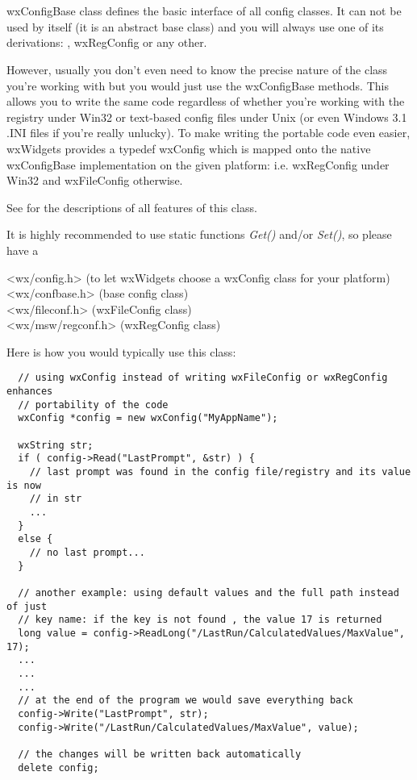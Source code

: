 \section{}\label{wxconfigbase}

wxConfigBase class defines the basic interface of all config classes. It can
not be used by itself (it is an abstract base class) and you will always use one
of its derivations: ,
wxRegConfig or any other.

However, usually you don't even need to know the precise nature of the class
you're working with but you would just use the wxConfigBase methods. This
allows you to write the same code regardless of whether you're working with
the registry under Win32 or text-based config files under Unix (or even
Windows 3.1 .INI files if you're really unlucky). To make writing the portable
code even easier, wxWidgets provides a typedef wxConfig
which is mapped onto the native wxConfigBase implementation on the given
platform: i.e. wxRegConfig under Win32 and
wxFileConfig otherwise.

See  for the descriptions of all
features of this class.

It is highly recommended to use static functions {\it Get()} and/or {\it Set()}, 
so please have a 




<wx/config.h> (to let wxWidgets choose a wxConfig class for your platform)\\
<wx/confbase.h> (base config class)\\
<wx/fileconf.h> (wxFileConfig class)\\
<wx/msw/regconf.h> (wxRegConfig class)


Here is how you would typically use this class:

\begin{verbatim}
  // using wxConfig instead of writing wxFileConfig or wxRegConfig enhances
  // portability of the code
  wxConfig *config = new wxConfig("MyAppName");

  wxString str;
  if ( config->Read("LastPrompt", &str) ) {
    // last prompt was found in the config file/registry and its value is now
    // in str
    ...
  }
  else {
    // no last prompt...
  }

  // another example: using default values and the full path instead of just
  // key name: if the key is not found , the value 17 is returned
  long value = config->ReadLong("/LastRun/CalculatedValues/MaxValue", 17);
  ...
  ...
  ...
  // at the end of the program we would save everything back
  config->Write("LastPrompt", str);
  config->Write("/LastRun/CalculatedValues/MaxValue", value);

  // the changes will be written back automatically
  delete config;
\end{verbatim}

